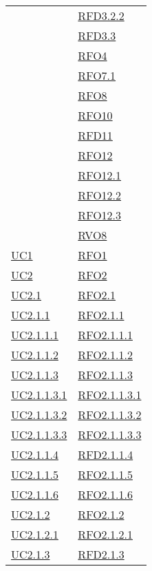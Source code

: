 \begin{longtable}{|>{\centering}m{5cm}|m{5cm}<{\centering}|}
& \hyperlink{RFD3.2.2}{RFD3.2.2}\\
& \hyperlink{RFD3.3}{RFD3.3}\\
& \hyperlink{RFO4}{RFO4}\\
& \hyperlink{RFO7.1}{RFO7.1}\\
& \hyperlink{RFO8}{RFO8}\\
& \hyperlink{RFO10}{RFO10}\\
& \hyperlink{RFD11}{RFD11}\\
& \hyperlink{RFO12}{RFO12}\\
& \hyperlink{RFO12.1}{RFO12.1}\\
& \hyperlink{RFO12.2}{RFO12.2}\\
& \hyperlink{RFO12.3}{RFO12.3}\\
& \hyperlink{RVO8}{RVO8}\\ \hline
\hyperref[UC1]{UC1} & \hyperlink{RFO1}{RFO1}\\ \hline
\hyperref[UC2]{UC2} & \hyperlink{RFO2}{RFO2}\\ \hline
\hyperref[UC2.1]{UC2.1} & \hyperlink{RFO2.1}{RFO2.1}\\ \hline
\hyperref[UC2.1.1]{UC2.1.1} & \hyperlink{RFO2.1.1}{RFO2.1.1}\\ \hline
\hyperref[UC2.1.1.1]{UC2.1.1.1} & \hyperlink{RFO2.1.1.1}{RFO2.1.1.1}\\ \hline
\hyperref[UC2.1.1.2]{UC2.1.1.2} & \hyperlink{RFO2.1.1.2}{RFO2.1.1.2}\\ \hline
\hyperref[UC2.1.1.3]{UC2.1.1.3} & \hyperlink{RFO2.1.1.3}{RFO2.1.1.3}\\ \hline
\hyperref[UC2.1.1.3.1]{UC2.1.1.3.1} & \hyperlink{RFO2.1.1.3.1}{RFO2.1.1.3.1}\\ \hline
\hyperref[UC2.1.1.3.2]{UC2.1.1.3.2} & \hyperlink{RFO2.1.1.3.2}{RFO2.1.1.3.2}\\ \hline
\hyperref[UC2.1.1.3.3]{UC2.1.1.3.3} & \hyperlink{RFO2.1.1.3.3}{RFO2.1.1.3.3}\\ \hline
\hyperref[UC2.1.1.4]{UC2.1.1.4} & \hyperlink{RFD2.1.1.4}{RFD2.1.1.4}\\ \hline
\hyperref[UC2.1.1.5]{UC2.1.1.5} & \hyperlink{RFO2.1.1.5}{RFO2.1.1.5}\\ \hline
\hyperref[UC2.1.1.6]{UC2.1.1.6} & \hyperlink{RFO2.1.1.6}{RFO2.1.1.6}\\ \hline
\hyperref[UC2.1.2]{UC2.1.2} & \hyperlink{RFO2.1.2}{RFO2.1.2}\\ \hline
\hyperref[UC2.1.2.1]{UC2.1.2.1} & \hyperlink{RFO2.1.2.1}{RFO2.1.2.1}\\ \hline
\hyperref[UC2.1.3]{UC2.1.3} & \hyperlink{RFD2.1.3}{RFD2.1.3}\\ \hline

\end{longtable}
